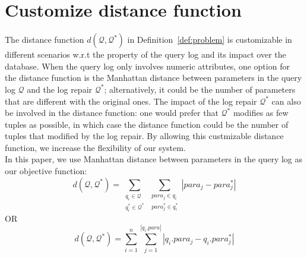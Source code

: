 \section{Customize distance function}
The distance function $d(\mathcal{Q}, \mathcal{Q}^*)$ 
in Definition~\ref{def:problem} is customizable 
in different scenarios w.r.t the property of the query log and its
impact over the database. 
When the query log only involves numeric attributes, one option for 
the distance function is the Manhattan distance between parameters in 
the query log $\mathcal{Q}$ and the log repair $\mathcal{Q}^*$; 
alternatively, it could be the number of 
parameters that are different with the original ones. The
impact of the log repair $\mathcal{Q}^*$ can also be involved 
in the distance function: one would prefer that $\mathcal{Q}^*$
modifies as few tuples as possible, in which case the distance 
function could be the number of tuples that modified by the log repair.
By allowing this custmizable distance function, we increase the flexibility 
of our system. \\
In this paper, we use Manhattan distance between parameters 
in the query log as our objective function: 
\[d(\mathcal{Q}, \mathcal{Q}^*) = \sum\limits_{\substack{ q_i \in \mathcal{Q}\\ q_i^* \in \mathcal{Q}^*}}  
\sum\limits_{\substack{para_j \in q_i\\ para_j^* \in q_i^*}}|para_j - para_j^*|\]
OR
\[d(\mathcal{Q}, \mathcal{Q}^*) = \sum_{i = 1} ^{n} \sum_{j = 1}^{|q_i.para|} |q_i.para_j - q_i.para_j^*|\]
